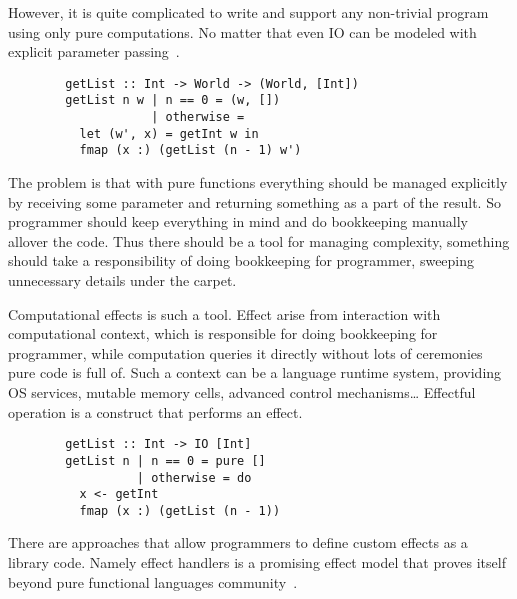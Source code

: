 \documentclass[conference]{IEEEtran}
\begin{document}
    However, it is quite complicated to write and support any non-trivial program using only pure computations.
    No matter that even IO can be modeled with explicit parameter passing~\cite{io}.

    \begin{verbatim}
        getList :: Int -> World -> (World, [Int])
        getList n w | n == 0 = (w, [])
                    | otherwise =
          let (w', x) = getInt w in
          fmap (x :) (getList (n - 1) w')
    \end{verbatim}

    The problem is that with pure functions everything should be managed explicitly by receiving some parameter and returning something as a part of the result.
    So programmer should keep everything in mind and do bookkeeping manually allover the code.
    Thus there should be a tool for managing complexity, something should take a responsibility of doing bookkeeping for programmer, sweeping unnecessary details under the carpet.

    Computational effects is such a tool.
    Effect arise from interaction with computational context, which is responsible for doing bookkeeping for programmer, while computation queries it directly without lots of ceremonies pure code is full of.
    Such a context can be a language runtime system, providing OS services, mutable memory cells, advanced control mechanisms\ldots
    Effectful operation is a construct that performs an effect.

    \begin{verbatim}
        getList :: Int -> IO [Int]
        getList n | n == 0 = pure []
                  | otherwise = do
          x <- getInt
          fmap (x :) (getList (n - 1))
    \end{verbatim}

    There are approaches that allow programmers to define custom effects as a library code.
    Namely effect handlers is a promising effect model that proves itself beyond pure functional languages community~\cite{eh-mainstream}.

%
\end{document}
